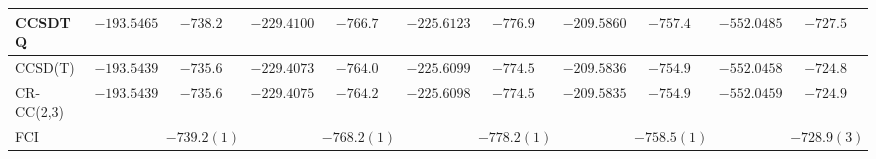 \documentclass[aip,jcp,reprint,noshowkeys,superscriptaddress,floatfix]{revtex4-1}
\begin{document}
\begin{squeezetable}
\begin{table*}
\begin{ruledtabular}
\begin{tabular}{lcccccccccc}
		CCSDTQ	&	$-193.5465$	&	$-738.2$	&	$-229.4100$	&	$-766.7$	&	$-225.6123$	&	$-776.9$	&	$-209.5860$	&	$-757.4$	&	$-552.0485$	&	$-727.5$	\\
		\hline
		CCSD(T)	&	$-193.5439$	&	$-735.6$	&	$-229.4073$	&	$-764.0$	&	$-225.6099$	&	$-774.5$	&	$-209.5836$	&	$-754.9$	&	$-552.0458$	&	$-724.8$
	\\
		CR-CC(2,3)&	$-193.5439$	&	$-735.6$	&	$-229.4075$	&	$-764.2$	&	$-225.6098$	&	$-774.5$	&	$-209.5835$	&	$-754.9$	&	$-552.0459$	&	$-724.9$
	\\
		\hline
		FCI	&					&	$-739.2(1)$	&				&	$-768.2(1)$	&				&	$-778.2(1)$	&				&	$-758.5(1)$	&				&	$-728.9(3)$\\
	\end{tabular}
	\end{ruledtabular}
\end{table*}
\end{squeezetable}
\end{document}
